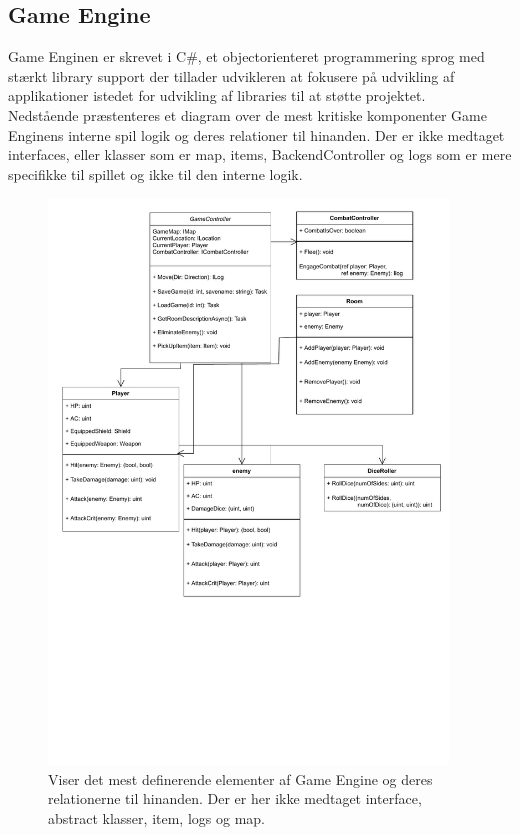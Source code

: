 \subsection{Game Engine}
Game Enginen er skrevet i C\#, et objectorienteret programmering sprog
med stærkt library support der tillader udvikleren at fokusere på udvikling
af applikationer istedet for udvikling af libraries til at støtte projektet. \\

\noindent Nedstående præstenteres et diagram over de mest kritiske komponenter
Game Enginens interne spil logik og deres relationer til hinanden.
Der er ikke medtaget interfaces, eller klasser som er map, items, BackendController 
og logs som er mere specifikke til spillet og ikke til den interne logik.\\

\begin{figure}[H]
  \centering
   
  \includegraphics[width=0.9\linewidth, height=15cm, trim = 0 8cm 0 0cm]{02-Body/Implementering/GameEngineImplementering/Images/Core Class Diagram.pdf}
  \caption{Viser det mest definerende elementer af Game Engine og deres relationerne til hinanden. Der er her ikke medtaget interface,
           abstract klasser, item, logs og map. }%
  \label{fig:CoreClassDiagram}
\end{figure}

